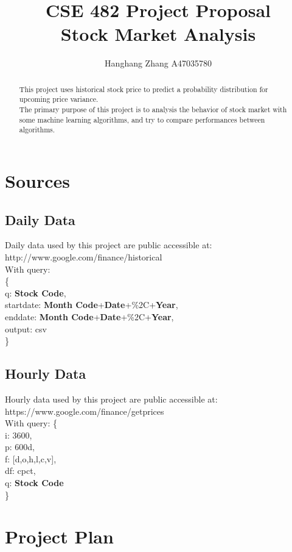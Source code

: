 \documentclass[11pt]{report}
\title{CSE 482 Project Proposal\\
\large Stock Market Analysis}
\author{Hanghang Zhang A47035780}
\begin{document}
\maketitle
\begin{abstract}
This project uses historical stock price to predict a probability distribution for upcoming price variance. \\
The primary purpose of this project is to analysis the behavior of stock market with some machine learning algorithms, and try to compare performances between algorithms.
\end{abstract}
\tableofcontents
\chapter{Sources}
\section{Daily Data}

Daily data used by this project are public accessible at:\\
http://www.google.com/finance/historical\\
With query:\\
\{\\
q: \textbf{Stock Code},\\
startdate: \textbf{Month Code}+\textbf{Date}+\%2C+\textbf{Year},\\
enddate: \textbf{Month Code}+\textbf{Date}+\%2C+\textbf{Year},\\
output: csv\\
\}
\section{Hourly Data}

Hourly data used by this project are public accessible at:\\
https://www.google.com/finance/getprices\\
With query:
\{\\
i: 3600,\\
p: 600d,\\
f: [d,o,h,l,c,v],\\
df: cpct,\\
q: \textbf{Stock Code}\\ 
\}

\chapter{Project Plan}
\end{document}
